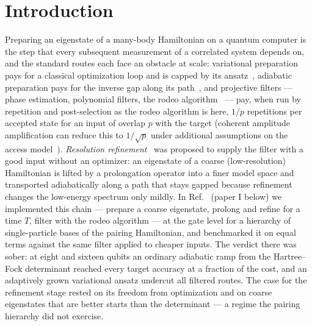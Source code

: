\documentclass[a4paper,11pt,noarxiv]{quantumarticle}
\begin{document}
\section{Introduction}
\label{sec:intro}
Preparing an eigenstate of a many-body Hamiltonian on a quantum computer is
the step that every subsequent measurement of a correlated system depends
on, and the standard routes each face an obstacle at scale: variational
preparation pays for a classical optimization loop and is capped by its
ansatz~\cite{Peruzzo2014,McClean2018}, adiabatic preparation pays for the
inverse gap along its path~\cite{Albash2018}, and projective filters ---
phase estimation, polynomial filters, the rodeo
algorithm~\cite{Choi2021,Qian2024} --- pay, when run by repetition and
post-selection as the rodeo algorithm is here, $1/p$ repetitions per
accepted state for an input of overlap $p$ with the target (coherent
amplitude amplification can reduce this to $1/\sqrt p$ under additional
assumptions on the access model~\cite{LinTong2020}).  \emph{Resolution refinement}~\cite{Bogner2026} was
proposed to supply the filter with a good input without an optimizer: an
eigenstate of a coarse (low-resolution) Hamiltonian is lifted by a
prolongation operator into a finer model space and transported
adiabatically along a path that stays gapped because refinement changes the
low-energy spectrum only mildly.  In Ref.~\cite{EigenQPairing2026} (paper I
below) we implemented this chain --- prepare a coarse eigenstate, prolong
and refine for a time $T$, filter with the rodeo algorithm --- at the gate
level for a hierarchy of single-particle bases of the pairing Hamiltonian,
and benchmarked it on equal terms against the same filter applied to
cheaper inputs.  The verdict there was sober: at eight and sixteen qubits an
ordinary adiabatic ramp from the Hartree--Fock determinant reached every
target accuracy at a fraction of the cost, and an adaptively grown
variational ansatz undercut all filtered routes.  The case for the
refinement stage rested on its freedom from optimization and on coarse
eigenstates that are better starts than the determinant --- a regime the
pairing hierarchy did not exercise.
\end{document}
